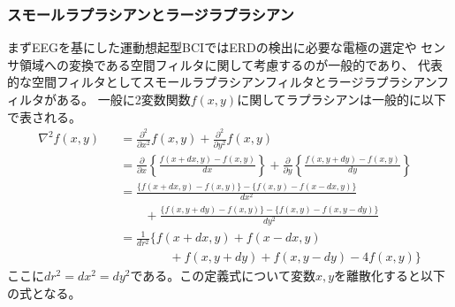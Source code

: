 \subsubsection{\mc スモールラプラシアンとラージラプラシアン}
まずEEGを基にした運動想起型BCIではERDの検出に必要な電極の選定や
センサ領域への変換である空間フィルタに関して考慮するのが一般的であり、
代表的な空間フィルタとしてスモールラプラシアンフィルタとラージラプラシアンフィルタがある。
一般に2変数関数\(f(x,y)\)に関してラプラシアンは一般的に以下で表される。
\begin{eqnarray}
    \nabla^2 f(x,y) && =  \frac{\partial^2}{\partial x^2}f(x,y)+\frac{\partial^2}{\partial y^2}f(x,y) \nonumber \\
    && =  \frac{\partial}{\partial x}\left\{ \frac{f(x+dx, y) - f(x,y)}{dx} \right\}
     + \frac{\partial}{\partial y}\left\{ \frac{f(x, y+dy) - f(x,y)}{dy} \right\} \nonumber \\
    && =  \frac{ \{f(x+dx,y)-f(x,y)\} - \{f(x,y)-f(x-dx,y)\}}{dx^2} \nonumber \\
    && \quad \quad +  \frac{ \{f(x,y+dy)-f(x,y)\} - \{f(x,y)-f(x,y-dy)\}}{dy^2} \nonumber \\
    && =  \frac{1}{dr^2}\{f (x+dx,y)+f(x-dx,y) \nonumber \\
    && \quad \quad \quad \quad +  f(x,y+dy)+f(x,y-dy)-4f(x,y)\}
\end{eqnarray}
ここに\(dr^2=dx^2=dy^2\)である。この定義式について変数\(x,y\)を離散化すると以下の式となる。
